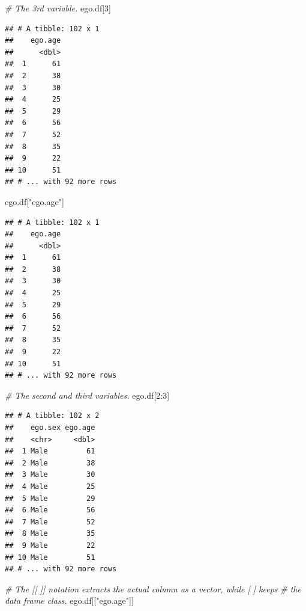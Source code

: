 \documentclass[
]{book}
\newenvironment{Shaded}{\begin{snugshade}}{\end{snugshade}}
\newcommand{\CommentTok}[1]{\textcolor[rgb]{0.56,0.35,0.01}{\textit{#1}}}
\newcommand{\DecValTok}[1]{\textcolor[rgb]{0.00,0.00,0.81}{#1}}
\newcommand{\NormalTok}[1]{#1}
\newcommand{\SpecialCharTok}[1]{\textcolor[rgb]{0.00,0.00,0.00}{#1}}
\newcommand{\StringTok}[1]{\textcolor[rgb]{0.31,0.60,0.02}{#1}}
\begin{document}
\begin{Shaded}
\begin{Highlighting}[]
\CommentTok{\# The 3rd variable.}
\NormalTok{ego.df[}\DecValTok{3}\NormalTok{]}
\end{Highlighting}
\end{Shaded}

\begin{verbatim}
## # A tibble: 102 x 1
##    ego.age
##      <dbl>
##  1      61
##  2      38
##  3      30
##  4      25
##  5      29
##  6      56
##  7      52
##  8      35
##  9      22
## 10      51
## # ... with 92 more rows
\end{verbatim}

\begin{Shaded}
\begin{Highlighting}[]
\NormalTok{ego.df[}\StringTok{"ego.age"}\NormalTok{]}
\end{Highlighting}
\end{Shaded}

\begin{verbatim}
## # A tibble: 102 x 1
##    ego.age
##      <dbl>
##  1      61
##  2      38
##  3      30
##  4      25
##  5      29
##  6      56
##  7      52
##  8      35
##  9      22
## 10      51
## # ... with 92 more rows
\end{verbatim}

\begin{Shaded}
\begin{Highlighting}[]
\CommentTok{\# The second and third variables.}
\NormalTok{ego.df[}\DecValTok{2}\SpecialCharTok{:}\DecValTok{3}\NormalTok{]}
\end{Highlighting}
\end{Shaded}

\begin{verbatim}
## # A tibble: 102 x 2
##    ego.sex ego.age
##    <chr>     <dbl>
##  1 Male         61
##  2 Male         38
##  3 Male         30
##  4 Male         25
##  5 Male         29
##  6 Male         56
##  7 Male         52
##  8 Male         35
##  9 Male         22
## 10 Male         51
## # ... with 92 more rows
\end{verbatim}

\begin{Shaded}
\begin{Highlighting}[]
\CommentTok{\# The [[ ]] notation extracts the actual column as a vector, while [ ] keeps}
\CommentTok{\# the data frame class.}
\NormalTok{ego.df[[}\StringTok{"ego.age"}\NormalTok{]]}
\end{Highlighting}
\end{Shaded}
\end{document}
